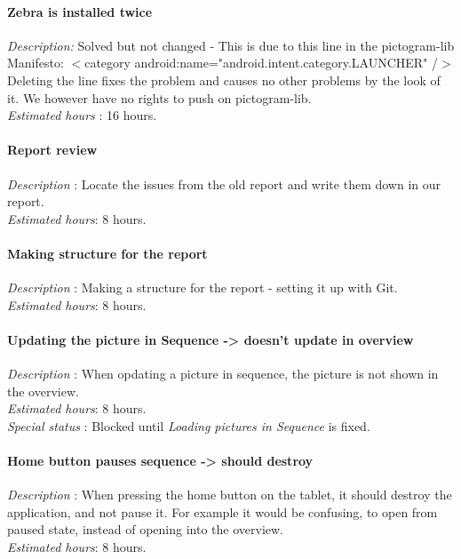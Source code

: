 \paragraph{Zebra is installed twice}
\emph{Description:} Solved but not changed - This is due to this line in the pictogram-lib Manifesto: 
$<$category android:name="android.intent.category.LAUNCHER" /$>$ 
Deleting the line fixes the problem and causes no other problems by the look of it. We however have no rights to push on pictogram-lib.\\
\emph{Estimated hours} : 16 hours.
\paragraph{Report review}
\emph{Description} : Locate the issues from the old report and write them down in our report.\\
\emph{Estimated hours}: 8 hours.
\paragraph{Making structure for the report}
\emph{Description} : Making a structure for the report - setting it up with Git.\\
\emph{Estimated hours}: 8 hours.
\paragraph{Updating the picture in Sequence -> doesn't update in overview}
\emph{Description} : When opdating a picture in sequence, the picture is not shown in the overview. \\
\emph{Estimated hours}: 8 hours.\\
\emph{Special status} : Blocked until \emph{Loading pictures in Sequence} is fixed.
\paragraph{Home button pauses sequence -> should destroy}
\emph{Description} : When pressing the home button on the tablet, it should destroy the application, and not pause it. For example it would be confusing, to open from paused state, instead of opening into the overview. \\
\emph{Estimated hours}: 8 hours.